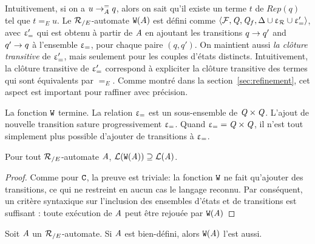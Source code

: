 Intuitivement, si on a $u \rightarrow^=_{A} q$, alors on sait qu'il existe
un terme $t$ de $Rep(q)$ tel que $t =_E u$. Le ${\mathcal R_{/E}}$-automate
$\mathtt{W}(A)$ est défini comme $\langle \mathcal{F}, \mathit Q, \mathit Q_f, \Delta \cup \upvarepsilon_{\mathcal R} \cup \upvarepsilon_{=}' \rangle$,
avec $\upvarepsilon_{=}'$ qui est obtenu à partir de $\mathit A$ en ajoutant les transitions $q \rightarrow q'$ and $q'
\rightarrow q$ à  l'ensemble $\upvarepsilon_{=}$, pour chaque paire $(q, q')$. On maintient aussi {\em
  la clôture transitive} de  $\upvarepsilon_{=}'$, mais seulement pour les couples d'états distincts.
Intuitivement, la clôture transitive de $\upvarepsilon_{=}'$ correspond à expliciter la
clôture transitive des termes qui sont équivalents par $=_E$.  Comme montré dans la
section~\ref{sec:refinement}, cet aspect est important pour raffiner avec précision.


\begin{remark}
  La fonction $\mathtt{W}$ termine. La relation $\upvarepsilon_{=}$ est un sous-ensemble de $\mathit Q \times \mathit Q$.
  L'ajout de nouvelle transition sature progressivement $\upvarepsilon_{=}$. Quand $\upvarepsilon_{=} = \mathit Q \times \mathit Q$,
  il n'est tout simplement plus possible d'ajouter de transitions à $\upvarepsilon_{=}$.
\end{remark}



\begin{lemma}
  Pour tout ${\mathcal R_{/E}}$-automate $\mathit A$, $\mathcal{L}(\mathtt{W}(\mathit A)) \supseteq \mathcal{L}(\mathit A)$.
\end{lemma}
\begin{proof}
Comme pour $\mathtt{C}$, la preuve est triviale: la fonction $\mathtt{W}$ ne fait qu'ajouter des transitions, 
ce qui ne restreint en aucun cas le langage reconnu. Par conséquent, un critère syntaxique sur l'inclusion
des ensembles d'états et de transitions est suffisant : toute exécution de $\mathit A$ peut être rejouée par $\mathtt{W}(\mathit A)$
\end{proof}


\begin{lemma}
  Soit $\mathit A$ un ${\mathcal R_{/E}}$-automate. Si $\mathit A$ est bien-défini, alors $\mathtt{W}(\mathit A)$ l'est aussi.
\end{lemma}

